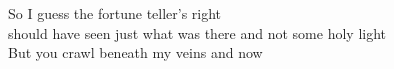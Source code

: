 So I guess the fortune teller's right \\
should have seen just what was there and not some holy light \\
But you crawl beneath my veins and now \\

